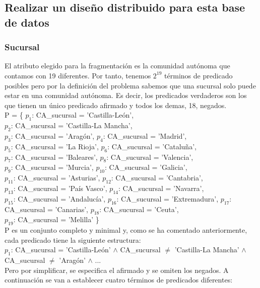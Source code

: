 \documentclass[paper=a4, fontsize=12pt]{article} %
\numberwithin{equation}{section} %
\numberwithin{figure}{section} %
\numberwithin{table}{section} %
\begin{document}
\subsection{Realizar un diseño distribuido para esta base de datos}
\subsubsection{Sucursal}
El atributo elegido para la fragmentación es la comunidad autónoma que contamos con 19 diferentes. Por tanto, tenemos $2^{19}$ términos de predicado posibles pero por la definición del problema sabemos que una sucursal solo puede estar en una comunidad autónoma. Es decir, los predicados verdaderos son los que tienen un único predicado afirmado y todos los demas, 18, negados. \\

P = \{ $p_{1}$: CA\_sucursal = 'Castilla-León', \\$p_{2}$: CA\_sucursal = 'Castilla-La Mancha', \\$p_{3}$: CA\_sucursal = 'Aragón', 
	$p_{4}$: CA\_sucursal = 'Madrid', \\$p_{5}$: CA\_sucursal = 'La Rioja', $p_{6}$: CA\_sucursal = 'Cataluña', 
	\\$p_{7}$: CA\_sucursal = 'Baleares', $p_{8}$: CA\_sucursal = 'Valencia', \\$p_{9}$: CA\_sucursal = 'Murcia', 
	$p_{10}$: CA\_sucursal = 'Galicia', \\$p_{11}$: CA\_sucursal = 'Asturias', $p_{12}$: CA\_sucursal = 'Cantabria', 
	\\$p_{13}$: CA\_sucursal = 'País Vasco', $p_{14}$: CA\_sucursal = 'Navarra', \\$p_{15}$: CA\_sucursal = 'Andalucía', 
	$p_{16}$: CA\_sucursal = 'Extremadura', $p_{17}$: CA\_sucursal = 'Canarias', $p_{18}$: CA\_sucursal = 'Ceuta',
	\\$p_{19}$: CA\_sucursal = 'Melilla' \}\\

P es un conjunto completo y minimal y, como se ha comentado anteriormente, cada predicado tiene la siguiente estructura: \\

$p_{1}$: CA\_sucursal = 'Castilla-León' $\land$ CA\_sucursal $\neq$ 'Castilla-La Mancha' $\land$ CA\_sucursal $\neq$ 'Aragón' $\land$ ... \\

Pero por simplificar, se especifica el afirmado y se omiten los negados. A continuación se van a establecer cuatro términos de predicados diferentes:
\end{document}
